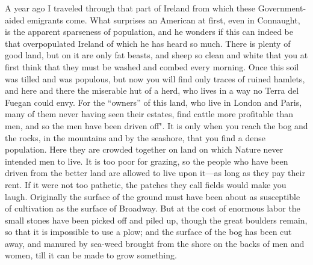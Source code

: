 \documentclass{book}
\begin{document}
A year ago I traveled through that part of Ireland from which these Government-aided emigrants come. What surprises an American at first, even in Connaught, is the apparent sparseness of population, and he wonders if this can indeed be that overpopulated Ireland of which he has heard so much. There is plenty of good land, but on it are only fat beasts, and sheep so clean and white that you at first think that they must be washed and combed every morning. Once this soil was tilled and was populous, but now you will find only traces of ruined hamlets, and here and there the miserable hut of a herd, who lives in a way no Terra del Fuegan could envy. For the “owners” of this land, who live in London and Paris, many of them never having seen their estates, find cattle more profitable than men, and so the men have been driven off". It is only when you reach the bog and the rocks, in the mountains and by the seashore, that you find a dense population. Here they are crowded together on land on which Nature never intended men to live. It is too poor for grazing, so the people who have been driven from the better land are allowed to live upon it—as long as they pay their rent. If it were not too pathetic, the patches they call fields would make you laugh. Originally the surface of the ground must have been about as susceptible of cultivation as the surface of Broadway. But at the cost of enormous labor the small stones have been picked off and piled up, though the great boulders remain, so that it is impossible to use a plow; and the surface of the bog has been cut away, and manured by sea-weed brought from the shore on the backs of men and women, till it can be made to grow something.
\end{document}
